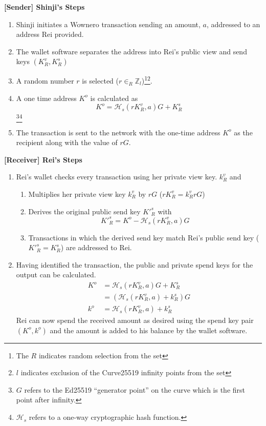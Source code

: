 \noindent\textbf{[Sender] Shinji's Steps}
\begin{enumerate}
    \item Shinji initiates a Wownero transaction sending an amount, $a$, addressed to an address Rei provided.
    \item The wallet software separates the address into Rei's public view and send keys $(K^v_R, K^s_R)$
    \item A random number $r$ is selected ($r \in _R\mathbb{Z}_l$)\footnote{The $R$ indicates random selection from the set}\footnote{$l$ indicates exclusion of the Curve25519 infinity points from the set}.
    \item A one time address $K^o$ is calculated as 
    \[K^o=\mathcal{H}_s(rK^v_R, a)G+K^s_R\]
    \footnote{$G$ refers to the Ed25519 ``generator point'' on the curve which is the first point after infinity.}\footnote{$\mathcal{H}_s$ refers to a one-way cryptographic hash function.}
    \item The transaction is sent to the network with the one-time address $K^o$ as the recipient along with the value of $rG$.
\end{enumerate}
\noindent\textbf{[Receiver] Rei's Steps}
\begin{enumerate}
    \item Rei's wallet checks every transaction using her private view key. $k^v_R$ and
    \begin{enumerate}
        \item Multiplies her private view key $k^v_R$ by $rG$ ($rK^v_R = k^v_RrG$)
        \item Derives the original public send key $K'^s_R$ with 
        \[K'^s_R = K^o-\mathcal{H}_s(rK^v_R,a)G\]
        \item Transactions in which the derived send key match Rei's public send key ($K'^s_R=K^s_R$) are addressed to Rei.
    \end{enumerate}
    \item Having identified the transaction, the public and private spend keys for the output can be calculated.
    \begin{align*}
        K^o &= \mathcal{H}_s(rK^v_R,a)G+K^s_R\\
        &= (\mathcal{H}_s(rK^v_R,a)+k^s_R)G\\
        k^o &=\mathcal{H}_s(rK^v_R,a)+k^s_R
    \end{align*}
    Rei can now spend the received amount as desired using the spend key pair $(K^o, k^o)$ and the amount is added to his balance by the wallet software.
\end{enumerate}

